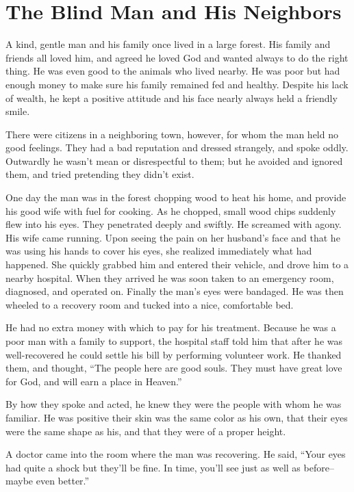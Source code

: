 \chapter{The Blind Man and His Neighbors}

A kind, gentle man and his family once lived in a large forest. His family and friends all loved him, and agreed he loved God and wanted always to do the right thing. He was even good to the animals who lived nearby. He was poor but had enough money to make sure his family remained fed and healthy. Despite his lack of wealth, he kept a positive attitude and his face nearly always held a friendly smile.

There were citizens in a neighboring town, however, for whom the man held no good feelings. They had a bad reputation and dressed strangely, and spoke oddly. Outwardly he wasn't mean or disrespectful to them; but he avoided and ignored them, and tried pretending they didn't exist.

One day the man was in the forest chopping wood to heat his home, and provide his good wife with fuel for cooking. As he chopped, small wood chips suddenly flew into his eyes. They penetrated deeply and swiftly. He screamed with agony. His wife came running. Upon seeing the pain on her husband's face and that he was using his hands to cover his eyes, she realized immediately what had happened. She quickly grabbed him and entered their vehicle, and drove him to a nearby hospital. When they arrived he was soon taken to an emergency room, diagnosed, and operated on. Finally the man's eyes were bandaged. He was then wheeled to a recovery room and tucked into a nice, comfortable bed.

He had no extra money with which to pay for his treatment. Because he was a poor man with a family to support, the hospital staff told him that after he was well-recovered he could settle his bill by performing volunteer work. He thanked them, and thought, “The people here are good souls. They must have great love for God, and will earn a place in Heaven.”

By how they spoke and acted, he knew they were the people with whom he was familiar. He was positive their skin was the same color as his own, that their eyes were the same shape as his, and that they were of a proper height.

A doctor came into the room where the man was recovering. He said, “Your eyes had quite a shock but they'll be fine. In time, you'll see just as well as before--maybe even better.”

